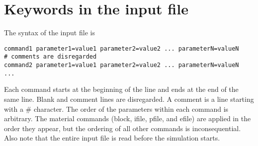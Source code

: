 \documentclass[11pt]{report}
\begin{document}

\chapter{Keywords in the input file}
The syntax of the input file is
\begin{verbatim}
command1 parameter1=value1 parameter2=value2 ... parameterN=valueN
# comments are disregarded
command2 parameter1=value1 parameter2=value2 ... parameterN=valueN
...
\end{verbatim}
Each command starts at the beginning of the line and ends at the end of the same line. Blank and
comment lines are disregarded. A comment is a line starting with a \# character. The order of the
parameters within each command is arbitrary. The material commands (block, ifile, pfile, and efile)
are applied in the order they appear, but the ordering of all other commands is
inconsequential. Also note that the entire input file is read before the simulation starts.
\end{document}
